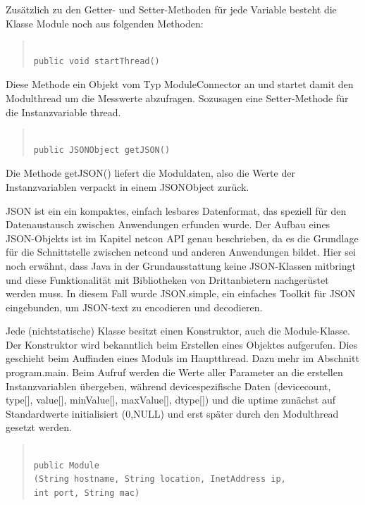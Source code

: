 \documentclass[a4paper,14pt,headsepline]{scrartcl}
\begin{document}
Zusätzlich zu den Getter- und Setter-Methoden für jede Variable besteht die Klasse Module noch aus folgenden Methoden:

\begin{quote}
\begin{verbatim}

public void startThread() 

\end{verbatim}
\end{quote}

Diese Methode ein Objekt vom Typ ModuleConnector an und startet damit den Modulthread um die Messwerte abzufragen. Sozusagen eine Setter-Methode für die Instanzvariable thread.  

\newpage

\begin{quote}
\begin{verbatim}

public JSONObject getJSON()

\end{verbatim}
\end{quote}

Die Methode getJSON() liefert die Moduldaten, also die Werte der Instanzvariablen verpackt in einem JSONObject zurück. 

JSON ist ein ein kompaktes, einfach lesbares Datenformat, das speziell für den Datenaustausch zwischen Anwendungen erfunden wurde. Der Aufbau eines JSON-Objekts ist im Kapitel netcon API genau beschrieben, da es die Grundlage für die Schnittstelle zwischen netcond und anderen Anwendungen bildet. Hier sei noch erwähnt, dass Java in der Grundausstattung keine JSON-Klassen mitbringt und diese Funktionalität mit Bibliotheken von Drittanbietern nachgerüstet werden muss. In diesem Fall wurde JSON.simple, ein einfaches Toolkit für JSON eingebunden, um JSON-text zu encodieren und decodieren.

Jede (nichtstatische) Klasse besitzt einen Konstruktor, auch die Module-Klasse. Der Konstruktor wird bekanntlich beim Erstellen eines Objektes aufgerufen. Dies geschieht beim Auffinden eines Moduls im Hauptthread. Dazu mehr im Abschnitt program.main. Beim Aufruf werden die Werte aller Parameter an die erstellen Instanzvariablen übergeben, während devicespezifische Daten (devicecount, type[], value[], minValue[], maxValue[], dtype[]) und die uptime zunächst auf Standardwerte initialisiert (0,NULL) und erst später durch den Modulthread gesetzt werden. 
\begin{quote}
\begin{verbatim}

public Module
(String hostname, String location, InetAddress ip, 
int port, String mac)

\end{verbatim}
\end{quote}
\end{document}
